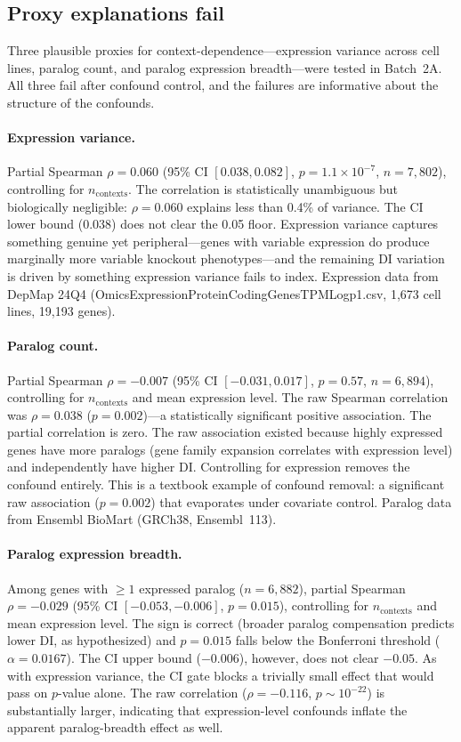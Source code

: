 \documentclass[11pt]{article}
\begin{document}
\subsection{Proxy explanations fail}

Three plausible proxies for context-dependence---expression variance
across cell lines, paralog count, and paralog expression breadth---were
tested in Batch~2A.  All three fail after confound control, and the
failures are informative about the structure of the confounds.

\paragraph{Expression variance.}
Partial Spearman $\rho = 0.060$ (95\% CI $[0.038, 0.082]$,
$p = 1.1 \times 10^{-7}$, $n = 7{,}802$), controlling for
$n_{\mathrm{contexts}}$.  The correlation is statistically unambiguous
but biologically negligible: $\rho = 0.060$ explains less than 0.4\% of
variance.  The CI lower bound (0.038) does not clear the 0.05 floor.
Expression variance captures something genuine yet peripheral---genes
with variable expression do produce marginally more variable knockout
phenotypes---and the remaining DI variation is driven by something
expression variance fails to index.  Expression data from DepMap 24Q4
(OmicsExpressionProteinCodingGenesTPMLogp1.csv, 1{,}673 cell lines,
19{,}193 genes).

\paragraph{Paralog count.}
Partial Spearman $\rho = -0.007$ (95\% CI $[-0.031, 0.017]$,
$p = 0.57$, $n = 6{,}894$), controlling for $n_{\mathrm{contexts}}$ and
mean expression level.  The raw Spearman correlation was
$\rho = 0.038$ ($p = 0.002$)---a statistically significant positive
association.  The partial correlation is zero.  The raw association
existed because highly expressed genes have more paralogs (gene family
expansion correlates with expression level) and independently have
higher DI.  Controlling for expression removes the confound entirely.
This is a textbook example of confound removal: a significant raw
association ($p = 0.002$) that evaporates under covariate control.
Paralog data from Ensembl BioMart (GRCh38, Ensembl~113).

\paragraph{Paralog expression breadth.}
Among genes with $\geq 1$ expressed paralog ($n = 6{,}882$), partial
Spearman $\rho = -0.029$ (95\% CI $[-0.053, -0.006]$, $p = 0.015$),
controlling for $n_{\mathrm{contexts}}$ and mean expression level.  The
sign is correct (broader paralog compensation predicts lower DI, as
hypothesized) and $p = 0.015$ falls below the Bonferroni threshold
($\alpha = 0.0167$).  The CI upper bound ($-0.006$), however, does not
clear $-0.05$.  As with expression variance, the CI gate blocks a trivially small effect
that would pass on $p$-value alone.  The raw correlation
($\rho = -0.116$, $p \sim 10^{-22}$) is substantially larger,
indicating that expression-level confounds inflate the apparent
paralog-breadth effect as well.
\end{document}
